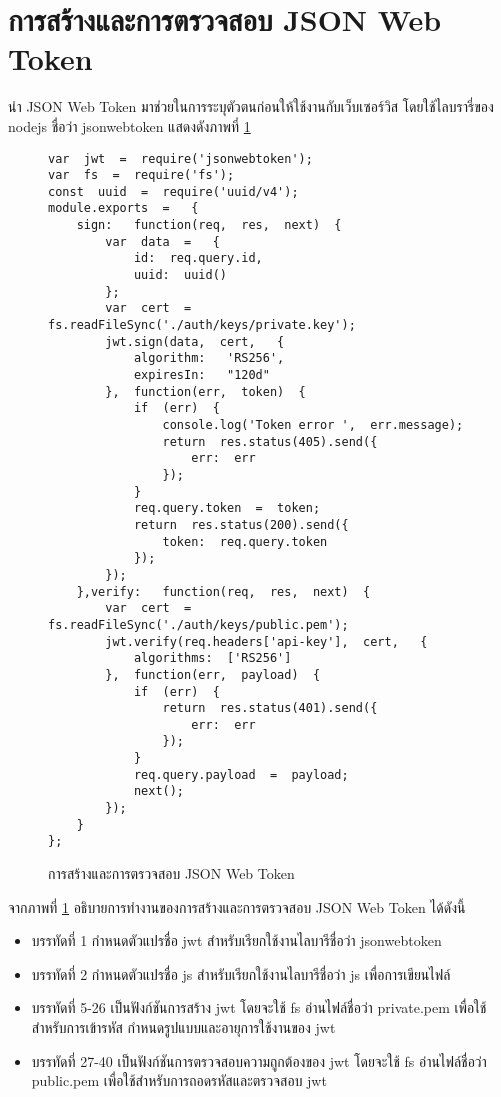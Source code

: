\section{การสร้างและการตรวจสอบ JSON Web Token}
	นำ JSON Web Token มาช่วยในการระบุตัวตนก่อนให้ใช้งานกับเว็บเซอร์วิส 
	โดยใช้ไลบรารี่ของ nodejs ชื่อว่า jsonwebtoken 
	แสดงดังภาพที่ \ref{Fig:jsonwebtokenMaker}
	\begin{figure}[H]
		{\begin{lstlisting}
var  jwt  =  require('jsonwebtoken');    
var  fs  =  require('fs');    
const  uuid  =  require('uuid/v4');    
module.exports  =   {        
	sign:   function(req,  res,  next)  {            
		var  data  =   {                
			id:  req.query.id,  
			uuid:  uuid()            
		};            
		var  cert  =  fs.readFileSync('./auth/keys/private.key');            
		jwt.sign(data,  cert,   {                
			algorithm:   'RS256',  
			expiresIn:   "120d"            
		},  function(err,  token)  {                
			if  (err)  {                    
				console.log('Token error ',  err.message);                    
				return  res.status(405).send({                        
					err:  err                    
				});                
			}                
			req.query.token  =  token;                
			return  res.status(200).send({                    
				token:  req.query.token                
			});            
		});        
	},verify:   function(req,  res,  next)  {            
		var  cert  =  fs.readFileSync('./auth/keys/public.pem');            
		jwt.verify(req.headers['api-key'],  cert,   {                
			algorithms:  ['RS256']            
		},  function(err,  payload)  {                
			if  (err)  {                    
				return  res.status(401).send({                        
					err:  err                    
				});                
			}                
			req.query.payload  =  payload;                
			next();           
		});        
	}  
};    
		\end{lstlisting}}
		\caption{การสร้างและการตรวจสอบ JSON Web Token}
		\label{Fig:jsonwebtokenMaker}
	\end{figure}
	จากภาพที่ \ref{Fig:jsonwebtokenMaker} อธิบายการทำงานของการสร้างและการตรวจสอบ JSON Web Token ได้ดังนี้
	\begin{itemize}[label={--}]
		\item บรรทัดที่ 1	กำหนดตัวแปรชื่อ jwt สำหรับเรียกใช้งานไลบารีชื่อว่า jsonwebtoken 
		\item บรรทัดที่ 2	กำหนดตัวแปรชื่อ js สำหรับเรียกใช้งานไลบารีชื่อว่า js เพื่อการเขียนไฟล์
		\item บรรทัดที่ 5-26	เป็นฟังก์ชันการสร้าง jwt โดยจะใช้ fs อ่านไฟล์ชื่อว่า private.pem เพื่อใช้สำหรับการเข้ารหัส กำหนดรูปแบบและอายุการใช้งานของ jwt
		\item บรรทัดที่ 27-40	เป็นฟังก์ชันการตรวจสอบความถูกต้องของ jwt โดยจะใช้ fs อ่านไฟล์ชื่อว่า public.pem เพื่อใช้สำหรับการถอดรหัสและตรวจสอบ jwt
	\end{itemize}



